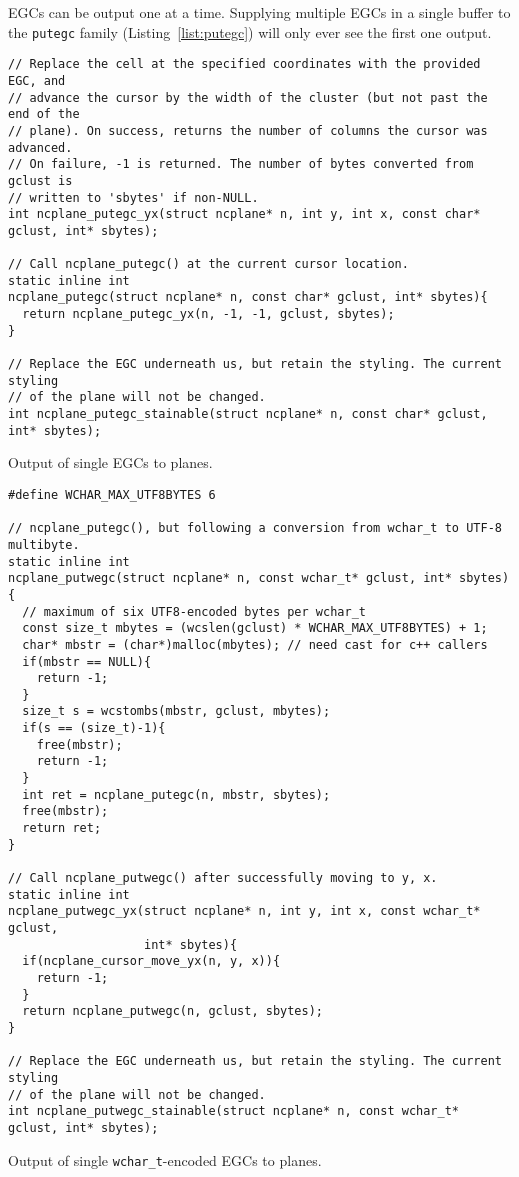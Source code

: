 EGCs can be output one at a time. Supplying multiple EGCs in a single buffer
to the \texttt{putegc} family (Listing~\ref{list:putegc}) will only ever see the first one output.

\begin{listing}[!htb]
\begin{verbatim}
// Replace the cell at the specified coordinates with the provided EGC, and
// advance the cursor by the width of the cluster (but not past the end of the
// plane). On success, returns the number of columns the cursor was advanced.
// On failure, -1 is returned. The number of bytes converted from gclust is
// written to 'sbytes' if non-NULL.
int ncplane_putegc_yx(struct ncplane* n, int y, int x, const char* gclust, int* sbytes);

// Call ncplane_putegc() at the current cursor location.
static inline int
ncplane_putegc(struct ncplane* n, const char* gclust, int* sbytes){
  return ncplane_putegc_yx(n, -1, -1, gclust, sbytes);
}

// Replace the EGC underneath us, but retain the styling. The current styling
// of the plane will not be changed.
int ncplane_putegc_stainable(struct ncplane* n, const char* gclust, int* sbytes);
\end{verbatim}
\caption{Output of single EGCs to planes.}
\label{list:putegc}
\end{listing}

\begin{listing}[!htb]
\begin{verbatim}
#define WCHAR_MAX_UTF8BYTES 6

// ncplane_putegc(), but following a conversion from wchar_t to UTF-8 multibyte.
static inline int
ncplane_putwegc(struct ncplane* n, const wchar_t* gclust, int* sbytes){
  // maximum of six UTF8-encoded bytes per wchar_t
  const size_t mbytes = (wcslen(gclust) * WCHAR_MAX_UTF8BYTES) + 1;
  char* mbstr = (char*)malloc(mbytes); // need cast for c++ callers
  if(mbstr == NULL){
    return -1;
  }
  size_t s = wcstombs(mbstr, gclust, mbytes);
  if(s == (size_t)-1){
    free(mbstr);
    return -1;
  }
  int ret = ncplane_putegc(n, mbstr, sbytes);
  free(mbstr);
  return ret;
}

// Call ncplane_putwegc() after successfully moving to y, x.
static inline int
ncplane_putwegc_yx(struct ncplane* n, int y, int x, const wchar_t* gclust,
                   int* sbytes){
  if(ncplane_cursor_move_yx(n, y, x)){
    return -1;
  }
  return ncplane_putwegc(n, gclust, sbytes);
}

// Replace the EGC underneath us, but retain the styling. The current styling
// of the plane will not be changed.
int ncplane_putwegc_stainable(struct ncplane* n, const wchar_t* gclust, int* sbytes);
\end{verbatim}
\caption{Output of single \texttt{wchar\_t}-encoded EGCs to planes.}
\label{list:putwegc}
\end{listing}

